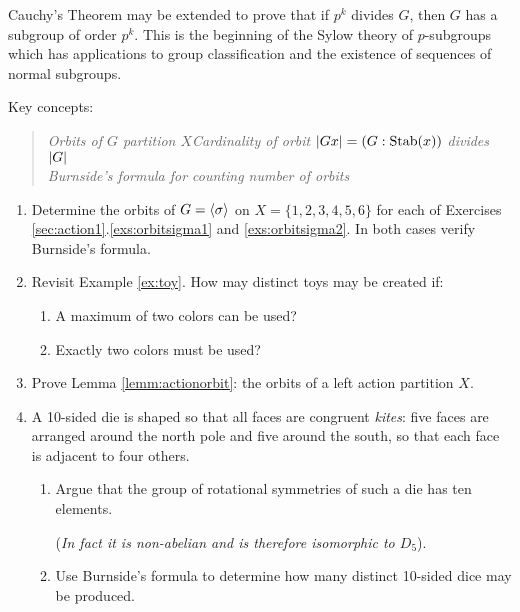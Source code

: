 Cauchy's Theorem may be extended to prove that if $p^k$ divides $G$, then $G$ has a subgroup of order $p^k$. This is the beginning of the Sylow theory of $p$-subgroups which has applications to group classification and the existence of sequences of normal subgroups. 


\goodbreak

\begin{exercises}{}{}
Key concepts:
\begin{quote}
\emph{Orbits of $G$ partition $X$\qquad Cardinality of orbit $\left| Gx\right|=(G:\operatorname{Stab}(x))$ divides $\left| G\right|$\\
Burnside's formula for counting number of orbits}
\end{quote}

\begin{enumerate}
  \item Determine the orbits of $G=\left\langle \sigma\right\rangle$ on $X=\{1,2,3,4,5,6\}$ for each of Exercises \ref*{sec:action1}.\ref{exs:orbitsigma1} and \ref{exs:orbitsigma2}. In both cases verify Burnside's formula.
  
  
	\item Revisit Example \ref{ex:toy}. How may distinct toys may be created if:
	\begin{enumerate}
	  \item A maximum of two colors can be used?
	  \item Exactly two colors must be used?
	\end{enumerate}
	
  
  \item Prove Lemma \ref{lemm:actionorbit}: the orbits of a left action partition $X$.
  
	
	\item A 10-sided die is shaped so that all faces are congruent \emph{kites}: five faces are arranged around the north pole and five around the south, so that each face is adjacent to four others.
	\begin{enumerate}
	  \item Argue that the group of rotational symmetries of such a die has ten elements.\par
	  (\emph{In fact it is non-abelian and is therefore isomorphic to $D_5$}).
	  \item Use Burnside's formula to determine how many distinct 10-sided dice may be produced.
	\end{enumerate}
	





\end{enumerate}
\end{exercises}
